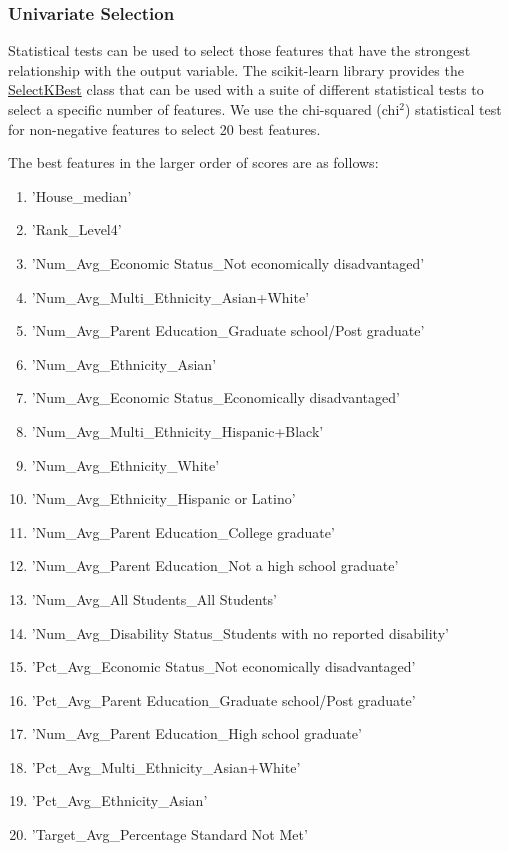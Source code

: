 \documentclass[11pt]{article}
\begin{document}
\subsubsection{Univariate Selection}

Statistical tests can be used to select those features that have the strongest relationship with the output variable.
%
The scikit-learn library provides the \href{https://scikit-learn.org/stable/modules/generated/sklearn.feature_selection.SelectKBest.html#sklearn.feature_selection.SelectKBest}{SelectKBest} class that can be used with a suite of different statistical tests to select a specific number of features.
%
We use the chi-squared (chi$^{2}$) statistical test for non-negative features to select 20 best features.

The best features in the larger order of scores are as follows:
\begin{enumerate}[topsep=0pt,itemsep=-1ex,partopsep=1ex,parsep=1ex]
\item 'House\_median'
\item 'Rank\_Level4'
\item 'Num\_Avg\_Economic Status\_Not economically disadvantaged'
\item 'Num\_Avg\_Multi\_Ethnicity\_Asian+White'
\item 'Num\_Avg\_Parent Education\_Graduate school/Post graduate'
\item 'Num\_Avg\_Ethnicity\_Asian'
\item 'Num\_Avg\_Economic Status\_Economically disadvantaged'
\item 'Num\_Avg\_Multi\_Ethnicity\_Hispanic+Black'
\item 'Num\_Avg\_Ethnicity\_White'
\item 'Num\_Avg\_Ethnicity\_Hispanic or Latino'
\item 'Num\_Avg\_Parent Education\_College graduate'
\item 'Num\_Avg\_Parent Education\_Not a high school graduate'
\item 'Num\_Avg\_All Students\_All Students'
\item 'Num\_Avg\_Disability Status\_Students with no reported disability'
\item 'Pct\_Avg\_Economic Status\_Not economically disadvantaged'
\item 'Pct\_Avg\_Parent Education\_Graduate school/Post graduate'
\item 'Num\_Avg\_Parent Education\_High school graduate'
\item 'Pct\_Avg\_Multi\_Ethnicity\_Asian+White'
\item 'Pct\_Avg\_Ethnicity\_Asian'
\item 'Target\_Avg\_Percentage Standard Not Met'
\end{enumerate}
\end{document}
